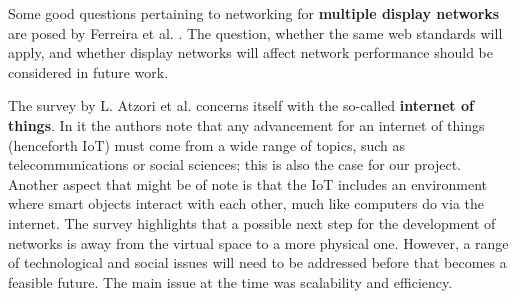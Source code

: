 Some good questions pertaining to networking for \textbf{multiple display networks} are posed by Ferreira et al. \cite{ferreira2012scalability}.
The question, whether the same web standards will apply, and whether display networks will affect network performance should be considered in future work.

The survey by L. Atzori et al. \cite{atzori2010internet} concerns itself with the so-called \textbf{internet of things}.
In it the authors note that any advancement for an internet of things (henceforth IoT) must come from a wide range of topics, such as telecommunications or social sciences; this is also the case for our project.
Another aspect that might be of note is that the IoT includes an environment where smart objects interact with each other, much like computers do via the internet.
The survey highlights that a possible next step for the development of networks is away from the virtual space to a more physical one.
However, a range of technological and social issues will need to be addressed before that becomes a feasible future.
The main issue at the time was scalability and efficiency.
